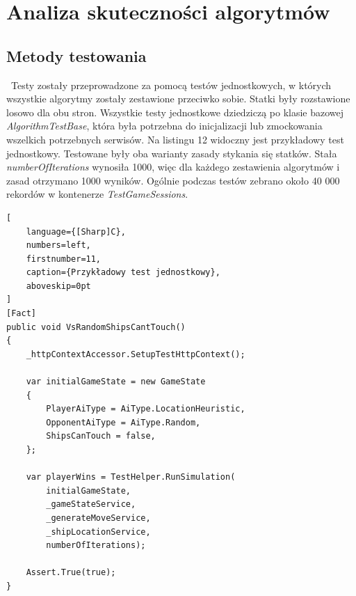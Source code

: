 \newpage %
\section{Analiza skuteczności algorytmów}

\subsection{Metody testowania}
\indent\ Testy zostały przeprowadzone za pomocą testów jednostkowych, w których wszystkie algorytmy zostały zestawione przeciwko sobie. Statki były rozstawione losowo dla obu stron. Wszystkie testy jednostkowe dziedziczą po klasie bazowej \emph{AlgorithmTestBase}, która była potrzebna do inicjalizacji lub zmockowania wszelkich potrzebnych serwisów. Na listingu 12 widoczny jest przykładowy test jednostkowy. Testowane były oba warianty zasady stykania się statków. Stała \emph{numberOfIterations} wynosiła 1000, więc dla każdego zestawienia algorytmów i zasad otrzymano 1000 wyników. Ogólnie podczas testów zebrano około 40 000 rekordów w kontenerze \emph{TestGameSessions}.

\begin{addmargin}[10mm]{0mm}
\begin{lstlisting}[
    language={[Sharp]C},
    numbers=left,
    firstnumber=11,
    caption={Przykładowy test jednostkowy},
    aboveskip=0pt
]
[Fact]
public void VsRandomShipsCantTouch()
{
    _httpContextAccessor.SetupTestHttpContext();

    var initialGameState = new GameState
    {
        PlayerAiType = AiType.LocationHeuristic,
        OpponentAiType = AiType.Random,
        ShipsCanTouch = false,
    };

    var playerWins = TestHelper.RunSimulation(
        initialGameState,
        _gameStateService,
        _generateMoveService,
        _shipLocationService,
        numberOfIterations);

    Assert.True(true);
}
\end{lstlisting}
\end{addmargin}


